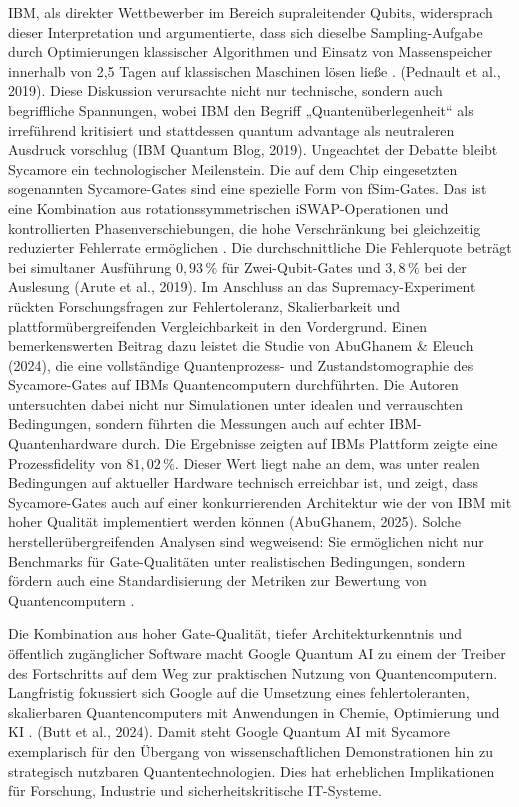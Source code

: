 IBM, als direkter Wettbewerber im Bereich supraleitender Qubits, widersprach dieser Interpretation und argumentierte, dass sich dieselbe Sampling-Aufgabe durch Optimierungen klassischer Algorithmen und Einsatz von Massenspeicher innerhalb von 2,5 Tagen auf klassischen Maschinen lösen ließe \cite{}. (Pednault et al., 2019). Diese Diskussion verursachte nicht nur technische, sondern auch begriffliche Spannungen, wobei IBM den Begriff „Quantenüberlegenheit“ als irreführend kritisiert und stattdessen quantum advantage als neutraleren Ausdruck vorschlug (IBM Quantum Blog, 2019). Ungeachtet der Debatte bleibt Sycamore ein technologischer Meilenstein. Die auf dem Chip eingesetzten sogenannten Sycamore-Gates sind eine spezielle Form von fSim-Gates. Das ist eine Kombination aus rotationssymmetrischen iSWAP-Operationen und kontrollierten Phasenverschiebungen, die hohe Verschränkung bei gleichzeitig reduzierter Fehlerrate ermöglichen \cite{abughanemPhotonicQuantumComputers2024}. Die durchschnittliche Die Fehlerquote beträgt bei simultaner Ausführung \(0{,}93\,\%\) für Zwei-Qubit-Gates und \(3{,}8\,\%\) bei der Auslesung \cite{}(Arute et al., 2019).
Im Anschluss an das Supremacy-Experiment rückten Forschungsfragen zur Fehlertoleranz, Skalierbarkeit und plattformübergreifenden Vergleichbarkeit in den Vordergrund. Einen bemerkenswerten Beitrag dazu leistet die Studie von AbuGhanem & Eleuch (2024), die eine vollständige Quantenprozess- und Zustandstomographie des Sycamore-Gates auf IBMs Quantencomputern durchführten. Die Autoren untersuchten dabei nicht nur Simulationen unter idealen und verrauschten Bedingungen, sondern führten die Messungen auch auf echter IBM-Quantenhardware durch. Die Ergebnisse zeigten auf IBMs Plattform zeigte eine Prozessfidelity von \(81{,}02\,\%\). Dieser Wert liegt nahe an dem, was unter realen Bedingungen auf aktueller Hardware technisch erreichbar ist, und zeigt, dass Sycamore-Gates auch auf einer konkurrierenden Architektur wie der von IBM mit hoher Qualität implementiert werden können \cite{}(AbuGhanem, 2025).
Solche herstellerübergreifenden Analysen sind wegweisend: Sie ermöglichen nicht nur Benchmarks für Gate-Qualitäten unter realistischen Bedingungen, sondern fördern auch eine Standardisierung der Metriken zur Bewertung von Quantencomputern \cite{abughanemPhotonicQuantumComputers2024}. 

Die Kombination aus hoher Gate-Qualität, tiefer Architekturkenntnis und öffentlich zugänglicher Software macht Google Quantum AI zu einem der Treiber des Fortschritts auf dem Weg zur praktischen Nutzung von Quantencomputern. Langfristig fokussiert sich Google auf die Umsetzung eines fehlertoleranten, skalierbaren Quantencomputers mit Anwendungen in Chemie, Optimierung und KI \cite{}. (Butt et al., 2024).
Damit steht Google Quantum AI mit Sycamore exemplarisch für den Übergang von wissenschaftlichen Demonstrationen hin zu strategisch nutzbaren Quantentechnologien. Dies hat erheblichen Implikationen für Forschung, Industrie und sicherheitskritische IT-Systeme.


